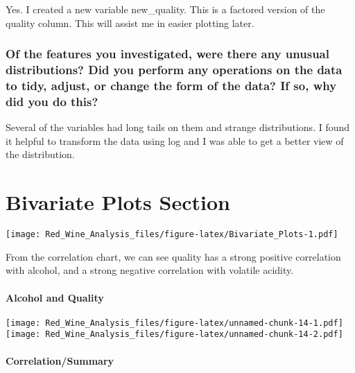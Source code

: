 \documentclass[]{article}
\let\oldparagraph\paragraph
\renewcommand{\paragraph}[1]{\oldparagraph{#1}\mbox{}}
\begin{document}
Yes. I created a new variable new\_quality. This is a factored version
of the quality column. This will assist me in easier plotting later.

\hypertarget{of-the-features-you-investigated-were-there-any-unusual-distributions-did-you-perform-any-operations-on-the-data-to-tidy-adjust-or-change-the-form-of-the-data-if-so-why-did-you-do-this}{%
\subsubsection{Of the features you investigated, were there any unusual
distributions? Did you perform any operations on the data to tidy,
adjust, or change the form of the data? If so, why did you do
this?}\label{of-the-features-you-investigated-were-there-any-unusual-distributions-did-you-perform-any-operations-on-the-data-to-tidy-adjust-or-change-the-form-of-the-data-if-so-why-did-you-do-this}}

Several of the variables had long tails on them and strange
distributions. I found it helpful to transform the data using log and I
was able to get a better view of the distribution.

\hypertarget{bivariate-plots-section}{%
\section{Bivariate Plots Section}\label{bivariate-plots-section}}

\texttt{[image: Red\_Wine\_Analysis\_files/figure-latex/Bivariate\_Plots-1.pdf]}

From the correlation chart, we can see quality has a strong positive
correlation with alcohol, and a strong negative correlation with
volatile acidity.

\hypertarget{alcohol-and-quality}{%
\paragraph{Alcohol and Quality}\label{alcohol-and-quality}}

\texttt{[image: Red\_Wine\_Analysis\_files/figure-latex/unnamed-chunk-14-1.pdf]}
\texttt{[image: Red\_Wine\_Analysis\_files/figure-latex/unnamed-chunk-14-2.pdf]}

\hypertarget{correlationsummary}{%
\paragraph{Correlation/Summary}\label{correlationsummary}}
\end{document}
